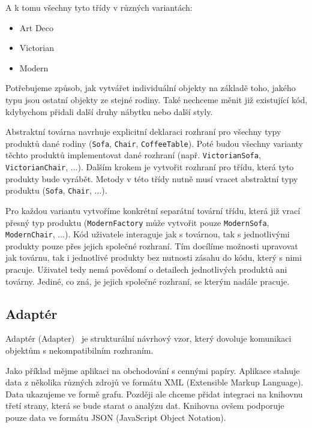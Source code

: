 A k tomu všechny tyto třídy v různých variantách:

\begin{itemize}
    \item Art Deco
    \item Victorian
    \item Modern
\end{itemize}

Potřebujeme způsob, jak vytvářet individuální objekty na základě toho, jakého typu jsou ostatní objekty ze stejné rodiny. Také nechceme měnit již existující kód, kdybychom přidali další druhy nábytku nebo další styly.

Abstraktní továrna navrhuje explicitní deklaraci rozhraní pro všechny typy produktů dané rodiny (\texttt{Sofa}, \texttt{Chair}, \texttt{CoffeeTable}). Poté budou všechny varianty těchto produktů implementovat dané rozhraní (např. \texttt{VictorianSofa}, \texttt{VictorianChair}, ...). Dalším krokem je vytvořit rozhraní pro třídu, která tyto produkty bude vyrábět. Metody v této třídy nutně musí vracet abstraktní typy produktu (\texttt{Sofa}, \texttt{Chair}, ...).

Pro každou variantu vytvoříme konkrétní separátní tovární třídu, která již vrací přesný typ produktu (\texttt{ModernFactory} může vytvořit pouze \texttt{ModernSofa}, \texttt{ModernChair}, ...). Kód uživatele interaguje jak s továrnou, tak s jednotlivými produkty pouze přes jejich společné rozhraní. Tím docílíme možnosti upravovat jak továrnu, tak i jednotlivé produkty bez nutnosti zásahu do kódu, který s nimi pracuje. Uživatel tedy nemá povědomí o detailech jednotlivých produktů ani továrny. Jediné, co zná, je jejich společné rozhraní, se kterým nadále pracuje.

\subsection{Adaptér}
\label{adapter}

Adaptér (Adapter)~\cite{Adapter} je strukturální návrhový vzor, který dovoluje komunikaci objektům s nekompatibilním rozhraním.

Jako příklad mějme aplikaci na obchodování s cennými papíry. Aplikace stahuje data z několika různých zdrojů ve formátu XML (Extensible Markup Language). Data ukazujeme ve formě grafu. Později ale chceme přidat integraci na knihovnu třetí strany, která se bude starat o analýzu dat. Knihovna ovšem podporuje pouze data ve formátu JSON (JavaScript Object Notation).

